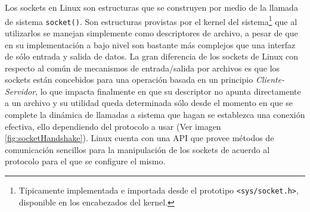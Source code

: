 Los sockets en Linux \cite{rfc:147, book:sockets} son estructuras que se construyen por medio de la llamada de sistema \verb=socket()=. Son estructuras provistas por el kernel del sistema\footnote{Típicamente implementada e importada desde el prototipo \verb=<sys/socket.h>=, disponible en los encabezados del kernel.} que al utilizarlos se manejan simplemente como descriptores de archivo, a pesar de que en su implementación a bajo nivel son bastante más complejos que una interfaz de sólo entrada y salida de datos. La gran diferencia de los sockets de Linux con respecto al común de mecanismos de entrada/salida por archivos es que los sockets están concebidos para una operación basada en un principio \emph{Cliente-Servidor}, lo que impacta finalmente en que su descriptor no apunta directamente a un archivo y su utilidad queda determinada sólo desde el momento en que se complete la dinámica de llamadas a sistema que hagan se establezca una conexión efectiva, ello dependiendo del protocolo a usar (Ver imagen \ref{fig:socketHandshake}). Linux cuenta con una API que provee métodos de comunicación sencillos para la manipulación de los sockets de acuerdo al protocolo para el que se configure el mismo.

